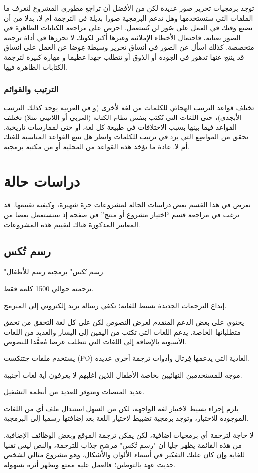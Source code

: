 توجد برمجيات تحرير صور عديدة لكن من الأفضل أن تراجع مطوري المشروع لتعرف
ما الملفات التي ستستخدمها وهل تدعم البرمجية صورا بديلة في الترجمة أم
لا، بدلا من أن تضيع وقتك في العمل على صُور لن تُستعمل. احرص على مراجعة
الكتابات الظاهرة في الصور بعناية، فاحتمال الأخطاء الإملائية وغيرها أكبر
لكونك لا تحررها في أداة ترجمة متخصصة. كذلك اسأل عن الصور في أنساق تحرير
وسيطة عِوضا عن العمل على أنساق قد ينتج عنها تدهور في الجودة أو الذوق أو
تتطلب جهدا عظيما و مهارة كبيرة لترجمة الكتابات الظاهرة فيها.

\subsection{الترتيب والقوائم}
تختلف قواعد الترتيب الهجائي للكلمات من لغة لأخرى (و في العربية يوجد كذلك
الترتيب الأبجدي)، حتى اللغات التي تُكتَب بنفس نظام الكتابة (العربي أو
اللاتيني مثلا) تختلف القواعد فيما بينها بسبب الاختلافات في طبيعة كل
لغة، أو حتى لممارسات تاريخية. تحقق من المواضِع التي يرد في ترتيب
للكلمات وانظر هل تتبع القواعد المناسبة للغتك أم لا. عادة ما تؤخذ هذه
القواعد من المحلية أو من مكتبة برمجية.

\chapter{دراسات حالة}
نعرض في هذا القسم بعض دراسات الحالة لمشروعات حرة شهيرة، وكيفية تقييمها.
قد ترغب في مراجعة قسم “اختيار مشروع أو منتج” في صفحة
 إذ سنستعمل بعضا من المعايير المذكورة هناك
لتقييم هذه المشروعات.

\section{رسم تُكس}
"رسم تُكس" برمجية رسم للأطفال.

\startitemize[1]
\item ترجمته حوالي 1500 كلمة فقط.
\item إيداع الترجمات الجديدة بسيط للغاية؛ تكفي رسالة بريد إلكتروني إلى
المبرمج.
\item يحتوي على بعض الدعم المتقدم لعرض النصوص لكن على كل لغة التحقق من
تحقق متطلباتها الخاصة. يدعم اللغات التي تكتب من اليمين إلى اليسار
والعديد من اللغات الآسيوية بالإضافة إلى اللغات التي تتطلب عرضا مُعقَّدا
للنصوص.
\item يستخدم ملفات جتتكست (PO) العادية التي يدعمها فِرتال وأدوات ترجمة
أخرى عديدة.
\item موجه للمستخدمين النهائيين بخاصة الأطفال الذين أغلبهم لا يعرفون أية
لغات أجنبية.
\item عديد المنصات ومتوفر للعديد من أنظمة التشغيل.
\item يلزم إجراء بسيط لاختبار لغة الواجهة، لكن من السهل استبدال ملف أي
من اللغات الموجودة للاختبار، وتوجد برمجية تضبيط لاختيار اللغة بعد
إضافتها رسميا إلى البرمجية.
\item لا حاجة لترجمة أي برمجيات إضافية، لكن يمكن ترجمة الموقع وبعض
الوظائف الإضافية.
\stopitemize
من هذه القائمة يظهر جليا أن "رسم تُكس" مرشح جذاب للترجمة، والنص ليس
تقنيا للغاية وإن كان عليك التفكير في أسماء الألوان والأشكال، وهو مشروع
مثالي لشخص حديث عهد بالتوطين؛ فالعمل عليه ممتع ويظهر أثره بسهوله.

